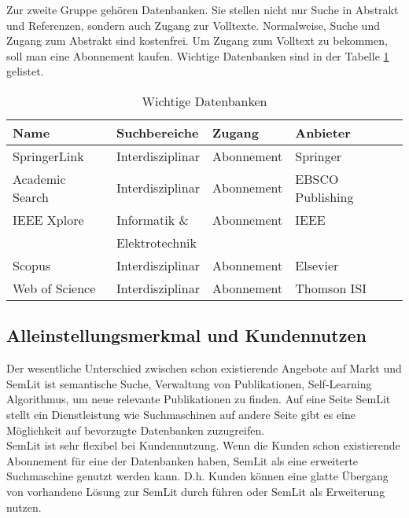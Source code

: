 Zur zweite Gruppe gehören Datenbanken. Sie stellen nicht nur Suche in Abstrakt und Referenzen, sondern auch Zugang zur Volltexte. Normalweise, Suche und Zugang zum Abstrakt sind kostenfrei. Um Zugang zum Volltext zu bekommen, soll man eine Abonnement kaufen. Wichtige Datenbanken sind in der Tabelle \ref{tab:wettDaten} gelistet. 
\begin{table}[h!]
  \centering
    \begin{footnotesize}
  \begin{tabular}{|l|l|l|l|}\hline
  \textbf{Name} &  \textbf{Suchbereiche} &  \textbf{Zugang} &  \textbf{Anbieter} \\ \hline
 SpringerLink & Interdisziplinar & Abonnement & Springer\\ \hline
 Academic Search & Interdisziplinar & Abonnement & EBSCO Publishing\\ \hline
 IEEE Xplore & Informatik \& & Abonnement & IEEE\\ 
 & Elektrotechnik & & \\ \hline
 Scopus & Interdisziplinar & Abonnement & Elsevier\\ \hline
 Web of Science & Interdisziplinar & Abonnement & Thomson ISI \\ \hline
  \end{tabular} 
    \end{footnotesize}
  \caption{Wichtige Datenbanken}
  \label{tab:wettDaten}
\end{table} 


\subsection{Alleinstellungsmerkmal und Kundennutzen}
Der wesentliche Unterschied zwischen schon existierende Angebote auf Markt und SemLit ist semantische Suche, Verwaltung von Publikationen, Self-Learning Algorithmus, um neue relevante Publikationen zu finden. Auf eine Seite SemLit stellt ein Dienstleistung wie Suchmaschinen auf andere Seite gibt es eine Möglichkeit auf bevorzugte Datenbanken zuzugreifen.\\
SemLit ist sehr flexibel bei Kundennutzung. Wenn die Kunden schon existierende Abonnement für eine der Datenbanken haben, SemLit als eine erweiterte Suchmaschine genutzt werden kann. D.h. Kunden können eine glatte Übergang von vorhandene Lösung zur SemLit durch führen oder SemLit als Erweiterung nutzen. 


